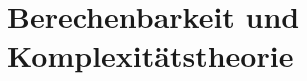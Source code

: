 \documentclass{lehramt-informatik-haupt}
\begin{document}

\chapter{Berechenbarkeit und Komplexitätstheorie}

\literatur
\end{document}
